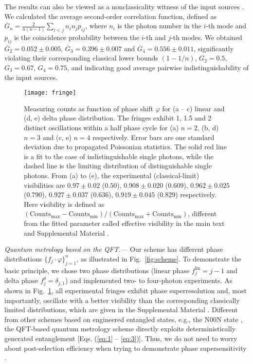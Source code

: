 \documentclass[aps,prl,twocolumn,superscriptaddress]{revtex4-1}
\begin{document}
The results can also be viewed as a nonclassicality witness of the input sources \cite{rigovacca2016}. We calculated the average second-order correlation function, defined as ${\overline G _n} = \frac{2}{{n(n - 1)}}\sum\nolimits_{i < j} {{n_i}{n_j}{p_{ij}}} $, where ${n_i}$ is the photon number in the $i$-th mode and ${p_{ij}}$ is the coincidence probability between the $i$-th and $j$-th modes. We obtained ${\overline G _2} = 0.052 \pm 0.005$, ${\overline G _3} = 0.396 \pm 0.007$ and ${\overline G _4} = 0.556 \pm 0.011$, significantly violating their corresponding classical lower bounds $(1 - 1/n)$, ${G_2} = 0.5$, ${G_3} = 0.67$, ${G_4} = 0.75$, and indicating good average pairwise indistinguishability of the input sources.


\begin{figure}[t]
\texttt{[image: fringe]}
\caption{\label{fig:fringe} Measuring counts as function of phase shift $\varphi$ for (a -- c) linear and (d, e) delta phase distribution. The fringes exhibit 1, 1.5 and 2 distinct oscillations within a half phase cycle for (a) $n=2$, (b, d) $n=3$ and (c, e) $n=4$ respectively. Error bars are one standard deviation due to propagated Poissonian statistics. The solid red line is a fit to the case of  indistinguishable single photons, while the dashed line is the limiting distribution of distinguishable single photons. From (a) to (e), the experimental (classical-limit) visibilities are $0.97 \pm 0.02$ ($0.50$), $0.908 \pm 0.020$ ($0.609$), $0.962 \pm 0.025$ ($0.790$), $0.927 \pm 0.037$ ($0.636$), $0.919 \pm 0.045$ ($0.829$) respectively. Here visibility is defined as $({\mbox{Counts}_{\max }} - {\mbox{Counts}_{\min }})/({\mbox{Counts}_{\max }} + {\mbox{Counts}_{\min }})$, different from the fitted parameter called effective visibility in the main text and Supplemental Material \cite{SUPPLEMENTALMATERIAL}.}
\end{figure}

{\em Quantum metrology based on the QFT.---} Our scheme has different phase distributions $\{ {f_j} \cdot \varphi \} _{j = 1}^n$, as illustrated in Fig.~\ref{fig:scheme}. To demonstrate the basic principle, we chose two phase distributions (linear phase $f_j^{{\mbox{lin}}} = j - 1$ and delta phase $f_j^\delta  = {\delta _{j,1}}$) and implemented two- to four-photon experiments. As shown in Fig.~\ref{fig:fringe}, all experimental fringes exhibit phase superresolution and, most importantly, oscillate with a better visibility than the corresponding classically limited distributions, which are given in the Supplemental Material \cite{SUPPLEMENTALMATERIAL}. Different from other schemes based on engineered entangled states, e.g., the N00N state \cite{boto2000,*dowling2008}, the QFT-based quantum metrology scheme directly exploits deterministically generated entanglement [Eqs. (\ref{eq:1} -- \ref{eq:3})]. Thus, we do not need to worry about post-selection efficiency when trying to demonstrate phase supersensitivity \cite{resch2007,*nagata2007}.
\end{document}
